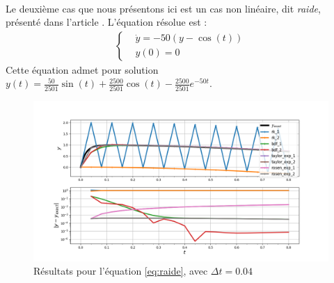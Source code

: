         \paragraph{}
        Le deuxième cas que nous présentons ici est un cas non linéaire, dit \emph{raide}, présenté dans l'article \cite{stiff_equation}.
        L'équation résolue est :
        \begin{equation}
            \begin{split}
                \left\{
                \begin{aligned}
                    &\dot{y} = -50\left(y - \cos\left(t\right)\right) \\
                    &y\left(0\right) = 0
                \end{aligned}
                \right.
            \end{split}
        \label{eq:raide}
        \end{equation}
        Cette équation admet pour solution $y\left(t\right) = \frac{50}{2501}\sin\left(t\right)+\frac{2500}{2501}\cos\left(t\right) -\frac{2500}{2501}e^{-50t}$.
        \begin{figure}[H]
            \centering
            \includegraphics[trim = 0cm 0cm 0cm 1cm, clip, width=\textwidth]{images/resultats/edo_raide.png}
            \caption{Résultats pour l'équation \ref{eq:raide}, avec $\Delta t = 0.04$}
            \label{fig:edo_raide}
        \end{figure}

